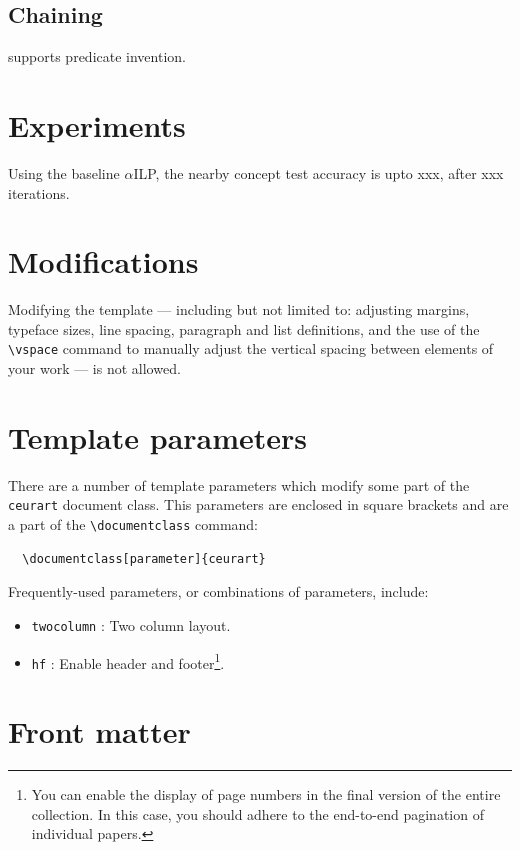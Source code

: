 \documentclass[
]{ceurart}
\begin{document}
\subsection{Chaining}
\cite{dILP} supports predicate invention.


\section{Experiments}

Using the baseline $\alpha$ILP, the nearby concept test accuracy is upto xxx, after xxx iterations.





\section{Modifications}

Modifying the template --- including but not limited to: adjusting
margins, typeface sizes, line spacing, paragraph and list definitions,
and the use of the \verb|\vspace| command to manually adjust the
vertical spacing between elements of your work --- is not allowed.

\section{Template parameters}

There are a number of template
parameters which modify some part of the \verb|ceurart| document class.
This parameters are enclosed in square
brackets and are a part of the \verb|\documentclass| command:
\begin{lstlisting}
  \documentclass[parameter]{ceurart}
\end{lstlisting}

Frequently-used parameters, or combinations of parameters, include:
\begin{itemize}
\item \verb|twocolumn| : Two column layout.
\item \verb|hf| : Enable header and footer\footnote{You can enable
    the display of page numbers in the final version of the entire
    collection. In this case, you should adhere to the end-to-end
    pagination of individual papers.}.
\end{itemize}

\section{Front matter}
\end{document}
